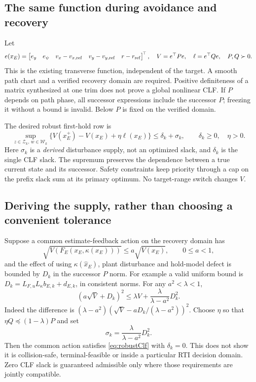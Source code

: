 \documentclass[10pt,letterpaper]{article}
\newcommand{\Z}{\mathcal Z}
\newcommand{\W}{\mathcal W}
\begin{document}
\subsection{The same function during avoidance and recovery}
Let
\begin{equation}\label{eq:clf}
e(x_E)=\begin{bmatrix}e_y&e_\psi&v_x-v_{x,\rm ref}&
v_y-v_{y,\rm ref}&r-r_{\rm ref}\end{bmatrix}^{\!\top},\quad
V=e^\top P e,\quad\ell=e^\top Qe,\quad P,Q\succ0.
\end{equation}
This is the existing transverse function, independent of the target. A smooth
path chart and a verified recovery domain are required. Positive definiteness
of a matrix synthesized at one trim does not prove a global nonlinear CLF. If $P$
depends on path phase, all successor expressions include the successor $P$;
freezing it without a bound is invalid. Below $P$ is fixed on the verified domain.

The desired robust first-hold row is
\begin{equation}\label{eq:robustClf}
\sup_{z\in\Z_k,\,w\in\W_k}
\{V(x_E^+)-V(x_E)+\eta\ell(x_E)\}
\le\delta_k+\sigma_k,\qquad \delta_k\ge0,\quad\eta>0.
\end{equation}
Here $\sigma_k$ is a \emph{derived} disturbance supply, not an optimized slack,
and $\delta_k$ is the single CLF slack. The supremum preserves the dependence
between a true current state and its successor. Safety constraints keep
priority through a cap on the prefix slack sum at its primary optimum. No target-range switch changes $V$.

\subsection{Deriving the supply, rather than choosing a convenient tolerance}
Suppose a common estimate-feedback action on the recovery domain has
\begin{equation}\label{eq:nominalContraction}
\sqrt{V(F_E(x_E,\kappa(x_E)))}\le a\sqrt{V(x_E)},\qquad 0\le a<1,
\end{equation}
and the effect of using $\kappa(\hat x_E)$, plant disturbance and hold-model
defect is bounded by $D_k$ in the successor $P$ norm. For example a valid
uniform bound is $D_k=L_{F,u}L_\kappa b_{E,k}+d_{E,k}$, in consistent norms.
For any $a^2<\lambda<1$,
\begin{equation}\label{eq:young}
(a\sqrt V+D_k)^2\le\lambda V+
\frac{\lambda}{\lambda-a^2}D_k^2.
\end{equation}
Indeed the difference is
$(\lambda-a^2)(\sqrt V-aD_k/(\lambda-a^2))^2$.
Choose $\eta$ so that $\eta Q\preceq(1-\lambda)P$ and set
\begin{equation}\label{eq:supply}
\sigma_k=\frac{\lambda}{\lambda-a^2}D_k^2.
\end{equation}
Then the common action satisfies \eqref{eq:robustClf} with $\delta_k=0$.
This does not show it is collision-safe, terminal-feasible or inside a
particular RTI decision domain. Zero CLF slack is guaranteed admissible only
where those requirements are jointly compatible.
\end{document}
